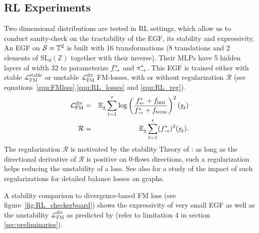 \documentclass{article}
\theoremstyle{plain}
\theoremstyle{definition}
\theoremstyle{remark}
\theoremstyle{fact}
\begin{document}
\subsection{RL Experiments}
Two dimensional distributions are tested  in RL settings, which allow us to conduct sanity-check on  the tractability of the EGF, its stability and expressivity. An EGF on $\mathcal S = \mathbb T^2$ is built with 16 transformations (8 translations and 2 elements of $\mathrm{SL}_d(\mathbb Z)$ together with their inverse). Their MLPs have 5 hidden layers of width 32 to parameterize $f^*_{\rightarrow}$ and $\pi_{\rightarrow}^*$. This EGF is trained either with stable $ \mathcal L_{\mathrm{FM}}^{\mathrm{stable}}$ or unstable $\mathcal L_{\mathrm{FM}}^{\mathrm{div}}$  FM-losses, with or without regularization  $\mathcal R$ (see equations~\eqref{equ:FMloss},\eqref{equ:RL_losses} and \eqref{equ:RL_reg}). 
\begin{eqnarray}\label{equ:RL_losses}
      \mathcal L_{\mathrm{FM}}^{\mathrm{div}} &=& \mathbb E_{\underline s}\sum_{t=1}^\tau \log\left(\frac{f^*_{\leftarrow}+f_{\mathrm{init}}}{f^*_{\rightarrow}+f_{\mathrm{term}}}\right)^2(\underline s_t) \\
            \mathcal R &=& \mathbb E_{\underline s}\sum_{t=1}^\tau (f^*_{\rightarrow})^2(\underline s_t) \label{equ:RL_reg}.
\end{eqnarray}
The regularization $\mathcal R$ is motivated by the stability Theory of \citet{brunswic2024theory}:
as long as the directional derivative of $\mathcal R$ is positive on 0-flows directions, such a regularization helps reducing the unstability of a loss. See also \citet{morozov2025revisiting} for a study of the impact of such regularizations for detailed balance losses on graphs.

 A stability comparison to divergence-based FM loss (see figure~\ref{fig:RL_checkerboard}) shows the expressivity of very small EGF as well as the unstability $\mathcal L_{\mathrm{FM}}^{\mathrm{div}}$ as predicted by \citet{brunswic2024theory}(refer to limitation 4 in section \ref{sec:preliminaries}). 
\end{document}
